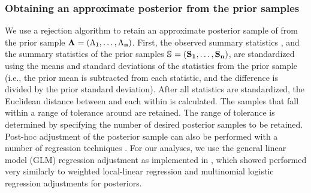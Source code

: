 \subsubsection*{Obtaining an approximate posterior from the prior samples}
We use a rejection algorithm to retain an approximate posterior sample of
\paramSampleVector{} from the prior sample
$\boldsymbol{\Lambda_{}} = (\Lambda_{1}, \ldots, \Lambda_{\mathbf{n}})$.
First, the observed summary statistics \ssVectorObs, and the summary statistics
of the prior samples 
$\ssMatrix = (\ssVector{1}, \ldots, \ssVector{\numPriorSamples})$,
are standardized using the means and standard deviations of the statistics from
the prior sample (i.e., the prior mean is subtracted from each statistic, and the
difference is divided by the prior standard deviation).
After all statistics are standardized, the Euclidean distance between
\ssVectorObs and each \ssVector{} within \ssMatrix is calculated.
The samples that fall within a range of tolerance \tol around \ssVectorObs
are retained.
The range of tolerance is determined by specifying the number of desired
posterior samples to be retained.
Post-hoc adjustment of the posterior sample can also be performed with a number
of regression techniques \citep{Beaumont2002,Blum2009,Leuenberger2010}.
For our analyses, we use the general linear model (GLM) regression adjustment
\citep{Leuenberger2010} as implemented in \abctoolbox
\citep[v1.1;][]{ABCtoolbox}, which \citet{Oaks2012} showed performed very
similarly to weighted local-linear regression and multinomial logistic
regression adjustments \citep{Beaumont2002} for \msb posteriors.


